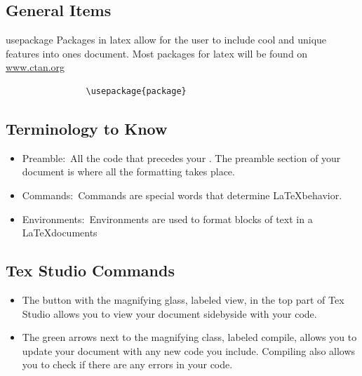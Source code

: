 \documentclass[12pt,hidelinks]{article}
\begin{document}
	\subsection{General Items}
		\begin{docCommand}{usepackage}{}
			Packages in latex allow for the user to include cool and unique features into ones document. Most packages for latex will be found on \url{www.ctan.org}
			\begin{verbatim}
				\usepackage{package}
			\end{verbatim}
		\end{docCommand}
	\subsection{Terminology to Know}
			\begin{itemize}
				\item Preamble:\, All the code that precedes your . The preamble section of your document is where all the formatting takes place. 
				\item Commands:\, Commands are special words that determine \LaTeX behavior.
				\item Environments:\, Environments are used to format blocks of text in a \LaTeX documents
			\end{itemize}
	\subsection{Tex Studio Commands}
		\begin{itemize}
			\item The button with the magnifying glass, labeled view, in the top part of Tex Studio allows you to view your document sidebyside with your code.
			\item The green arrows next to the magnifying class, labeled compile, allows you to update your document with any new code you include. Compiling also allows you to check if there are any errors in your code.  
		\end{itemize}
\end{document}
